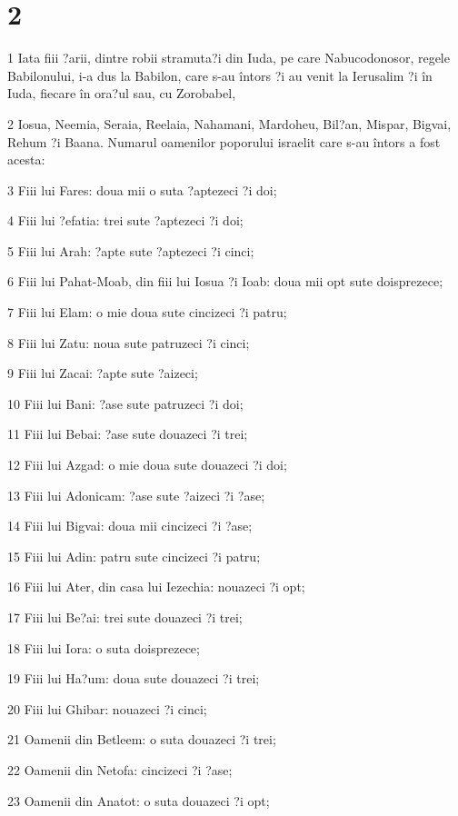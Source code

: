 \chapter{2}

\par 1 Iata fiii ?arii, dintre robii stramuta?i din Iuda, pe care Nabucodonosor, regele Babilonului, i-a dus la Babilon, care s-au întors ?i au venit la Ierusalim ?i în Iuda, fiecare în ora?ul sau, cu Zorobabel,
\par 2 Iosua, Neemia, Seraia, Reelaia, Nahamani, Mardoheu, Bil?an, Mispar, Bigvai, Rehum ?i Baana. Numarul oamenilor poporului israelit care s-au întors a fost acesta:
\par 3 Fiii lui Fares: doua mii o suta ?aptezeci ?i doi;
\par 4 Fiii lui ?efatia: trei sute ?aptezeci ?i doi;
\par 5 Fiii lui Arah: ?apte sute ?aptezeci ?i cinci;
\par 6 Fiii lui Pahat-Moab, din fiii lui Iosua ?i Ioab: doua mii opt sute doisprezece;
\par 7 Fiii lui Elam: o mie doua sute cincizeci ?i patru;
\par 8 Fiii lui Zatu: noua sute patruzeci ?i cinci;
\par 9 Fiii lui Zacai: ?apte sute ?aizeci;
\par 10 Fiii lui Bani: ?ase sute patruzeci ?i doi;
\par 11 Fiii lui Bebai: ?ase sute douazeci ?i trei;
\par 12 Fiii lui Azgad: o mie doua sute douazeci ?i doi;
\par 13 Fiii lui Adonicam: ?ase sute ?aizeci ?i ?ase;
\par 14 Fiii lui Bigvai: doua mii cincizeci ?i ?ase;
\par 15 Fiii lui Adin: patru sute cincizeci ?i patru;
\par 16 Fiii lui Ater, din casa lui Iezechia: nouazeci ?i opt;
\par 17 Fiii lui Be?ai: trei sute douazeci ?i trei;
\par 18 Fiii lui Iora: o suta doisprezece;
\par 19 Fiii lui Ha?um: doua sute douazeci ?i trei;
\par 20 Fiii lui Ghibar: nouazeci ?i cinci;
\par 21 Oamenii din Betleem: o suta douazeci ?i trei;
\par 22 Oamenii din Netofa: cincizeci ?i ?ase;
\par 23 Oamenii din Anatot: o suta douazeci ?i opt;
